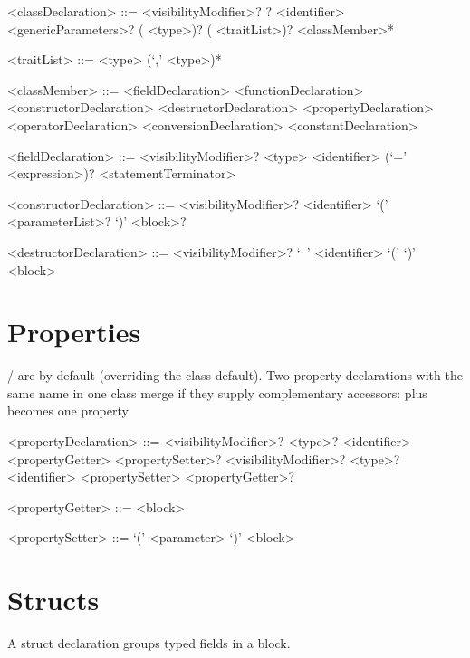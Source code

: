 \documentclass[makeidx]{article}
\begin{document}
\begin{grammar}
<classDeclaration> ::= <visibilityModifier>? \OPEN{}? \CLASS{} <identifier>
  \gnewline{} <genericParameters>? (\EXTENDS{} <type>)?
  \gnewline{} (\IMPLEMENTS{} <traitList>)? \HAS{} <classMember>* \END{}

<traitList> ::= <type> (`,' <type>)*

<classMember> ::= <fieldDeclaration>
  \alt <functionDeclaration>
  \alt <constructorDeclaration>
  \alt <destructorDeclaration>
  \alt <propertyDeclaration>
  \alt <operatorDeclaration>
  \alt <conversionDeclaration>
  \alt <constantDeclaration>

<fieldDeclaration> ::= <visibilityModifier>? <type> <identifier>
  \gnewline{} (`=' <expression>)? <statementTerminator>

<constructorDeclaration> ::= <visibilityModifier>? <identifier>
  \gnewline{} `(' <parameterList>? `)' \INITIALIZE{} <block>?

<destructorDeclaration> ::= <visibilityModifier>? `~' <identifier>
  \gnewline{} `(' `)' <block>
\end{grammar}

\section{Properties}

\LMHash{}%
/ are  by default (overriding the
class  default). Two property declarations with the same
name in one class merge if they supply complementary accessors:
 plus  becomes
one property.

\begin{grammar}
<propertyDeclaration> ::= <visibilityModifier>? <type>? <identifier>
  \gnewline{} <propertyGetter> <propertySetter>?
  \alt <visibilityModifier>? <type>? <identifier>
  \gnewline{} <propertySetter> <propertyGetter>?

<propertyGetter> ::= \GET{} <block>

<propertySetter> ::= \SET{} `(' <parameter> `)' <block>
\end{grammar}

\section{Structs}

\LMHash{}%
A struct declaration groups typed fields in a  block.
\end{document}
